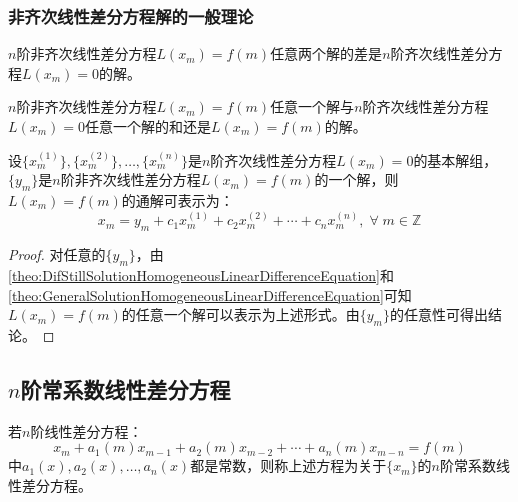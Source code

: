 \subsubsection{非齐次线性差分方程解的一般理论}
\begin{theorem}\label{theo:DifStillSolutionHomogeneousLinearDifferenceEquation}
	$n$阶非齐次线性差分方程$L(x_m)=f(m)$任意两个解的差是$n$阶齐次线性差分方程$L(x_m)=0$的解。
\end{theorem}
\begin{theorem}\label{theo:AddStillSolutionNonhomogeneousLinearDifferenceEquation}
	$n$阶非齐次线性差分方程$L(x_m)=f(m)$任意一个解与$n$阶齐次线性差分方程$L(x_m)=0$任意一个解的和还是$L(x_m)=f(m)$的解。
\end{theorem}
\begin{theorem}\label{theo:GeneralSolutionNonhomogeneousLinearDifferenceEquation}
	设$\{x_m^{(1)}\},\{x_m^{(2)}\},\dots,\{x_m^{(n)}\}$是$n$阶齐次线性差分方程$L(x_m)=0$的基本解组，$\{y_m\}$是$n$阶非齐次线性差分方程$L(x_m)=f(m)$的一个解，则$L(x_m)=f(m)$的通解可表示为：
	\begin{equation*}
		x_m=y_m+c_1x_m^{(1)}+c_2x_m^{(2)}+\cdots+c_nx_m^{(n)},\;\forall\;m\in\mathbb{Z}^{}
	\end{equation*}
\end{theorem}
\begin{proof}
	对任意的$\{y_m\}$，由\cref{theo:DifStillSolutionHomogeneousLinearDifferenceEquation}和\cref{theo:GeneralSolutionHomogeneousLinearDifferenceEquation}可知$L(x_m)=f(m)$的任意一个解可以表示为上述形式。由$\{y_m\}$的任意性可得出结论。
\end{proof}

\subsection{$n$阶常系数线性差分方程}
\begin{definition}
	若$n$阶线性差分方程：
	\begin{equation*}
		x_m+a_1(m)x_{m-1}+a_2(m)x_{m-2}+\cdots+a_n(m)x_{m-n}=f(m)
	\end{equation*}
	中$a_1(x),a_2(x),\dots,a_n(x)$都是常数，则称上述方程为关于$\{x_m\}$的$n$阶常系数线性差分方程。
\end{definition}
